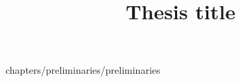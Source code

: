 \documentclass[11pt,a4paper,twoside]{book}
\begin{document}
\title{Thesis title}


\beforepreface%





\afterpreface%




 {chapters/preliminaries/preliminaries}





 





\cleardoublepage%
%
\printbibliography[heading=bibintoc]%


\appendix


\end{document}

